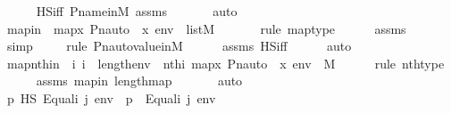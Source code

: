 \begin{isabellebody}
\ \ \ \ \isamarkupfalse%
\ HS{\isacharunderscore}{\kern0pt}iff\ P{\isacharunderscore}{\kern0pt}name{\isacharunderscore}{\kern0pt}in{\isacharunderscore}{\kern0pt}M\ assms\ \isanewline
\ \ \ \ \isamarkupfalse%
\ auto\isanewline
\isanewline
\ \ \isamarkupfalse%
\ mapin\ {\isacharcolon}{\kern0pt}\ {\isachardoublequoteopen}map{\isacharparenleft}{\kern0pt}{\isasymlambda}x{\isachardot}{\kern0pt}\ Pn{\isacharunderscore}{\kern0pt}auto{\isacharparenleft}{\kern0pt}{\isasympi}{\isacharparenright}{\kern0pt}\ {\isacharbackquote}{\kern0pt}\ x{\isacharcomma}{\kern0pt}\ env{\isacharparenright}{\kern0pt}\ {\isasymin}\ list{\isacharparenleft}{\kern0pt}M{\isacharparenright}{\kern0pt}{\isachardoublequoteclose}\ \ \isanewline
\ \ \ \ \isamarkupfalse%
{\isacharparenleft}{\kern0pt}rule\ map{\isacharunderscore}{\kern0pt}type{\isacharparenright}{\kern0pt}\isanewline
\ \ \ \ \isamarkupfalse%
\ assms\ \isanewline
\ \ \ \ \ \isamarkupfalse%
\ simp\isanewline
\ \ \ \ \isamarkupfalse%
{\isacharparenleft}{\kern0pt}rule\ Pn{\isacharunderscore}{\kern0pt}auto{\isacharunderscore}{\kern0pt}value{\isacharunderscore}{\kern0pt}in{\isacharunderscore}{\kern0pt}M{\isacharparenright}{\kern0pt}\isanewline
\ \ \ \ \isamarkupfalse%
\ assms\ HS{\isacharunderscore}{\kern0pt}iff\isanewline
\ \ \ \ \isamarkupfalse%
\ auto\isanewline
\isanewline
\ \ \isamarkupfalse%
\ mapnthin\ {\isacharcolon}{\kern0pt}\ {\isachardoublequoteopen}{\isasymAnd}i{\isachardot}{\kern0pt}\ i\ {\isacharless}{\kern0pt}\ length{\isacharparenleft}{\kern0pt}env{\isacharparenright}{\kern0pt}\ {\isasymLongrightarrow}\ nth{\isacharparenleft}{\kern0pt}i{\isacharcomma}{\kern0pt}\ map{\isacharparenleft}{\kern0pt}{\isasymlambda}x{\isachardot}{\kern0pt}\ Pn{\isacharunderscore}{\kern0pt}auto{\isacharparenleft}{\kern0pt}{\isasympi}{\isacharparenright}{\kern0pt}\ {\isacharbackquote}{\kern0pt}\ x{\isacharcomma}{\kern0pt}\ env{\isacharparenright}{\kern0pt}{\isacharparenright}{\kern0pt}\ {\isasymin}\ M{\isachardoublequoteclose}\ \isanewline
\ \ \ \ \isamarkupfalse%
{\isacharparenleft}{\kern0pt}rule\ nth{\isacharunderscore}{\kern0pt}type{\isacharparenright}{\kern0pt}\isanewline
\ \ \ \ \isamarkupfalse%
\ assms\ mapin\ length{\isacharunderscore}{\kern0pt}map\ \isanewline
\ \ \ \ \isamarkupfalse%
\ auto\isanewline
\isanewline
\ \ \isamarkupfalse%
\ {\isachardoublequoteopen}p\ {\isasymtturnstile}HS\ Equal{\isacharparenleft}{\kern0pt}i{\isacharcomma}{\kern0pt}\ j{\isacharparenright}{\kern0pt}\ env\ {\isasymlongleftrightarrow}\ p\ {\isasymtturnstile}\ Equal{\isacharparenleft}{\kern0pt}i{\isacharcomma}{\kern0pt}\ j{\isacharparenright}{\kern0pt}\ env{\isachardoublequoteclose}\ \isanewline

\end{isabellebody}
